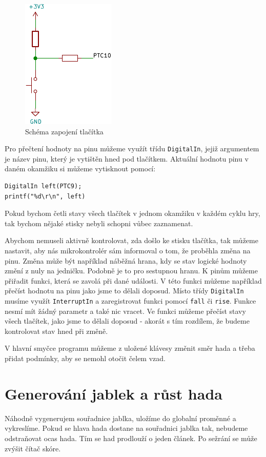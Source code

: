 \documentclass[12pt]{article}
\begin{document}
\begin{figure}[ht]
\centering
\includegraphics{figures/button}
\caption{Schéma zapojení tlačítka}
 \label{fig:button}
\end{figure}
\FloatBarrier

Pro přečtení hodnoty na pinu můžeme využít třídu \texttt{DigitalIn}, jejiž argumentem je název pinu, který je vytištěn hned pod tlačítkem.
Aktuální hodnotu pinu v daném okamžiku si můžeme vytisknout pomocí:
\begin{verbatim}
DigitalIn left(PTC9);
printf("%d\r\n", left)
\end{verbatim}

Pokud bychom četli stavy všech tlačítek v jednom okamžiku v každém cyklu hry, tak bychom nějaké stisky nebyli schopni vůbec zaznamenat. 

Abychom nemuseli aktivně kontrolovat, zda došlo ke stisku tlačítka, tak můžeme nastavit, aby nás mikrokontrolér sám informoval o tom, že proběhla změna na pinu.
Změna může být například náběžná hrana, kdy se stav logické hodnoty změní z nuly na jedničku.
Podobně je to pro sestupnou hranu.
K pinům můžeme přiřadit funkci, která se zavolá při dané události.
V této funkci můžeme například přečíst hodnotu na pinu jako jsme to dělali doposud.
Místo třídy \texttt{DigitalIn} musíme využít \texttt{InterruptIn} a zaregistrovat funkci pomocí \texttt{fall} či \texttt{rise}.
Funkce nesmí mít žádný parametr a také nic vracet.
Ve funkci můžeme přečíst stavy všech tlačítek, jako jsme to dělali doposud - akorát s tím rozdílem, že budeme kontrolovat stav hned při změně.

V hlavní smyčce programu můžeme z uložené klávesy změnit směr hada a třeba přidat podmínky, aby se nemohl otočit čelem vzad.

\section{Generování jablek a růst hada}
Náhodně vygenerujem souřadnice jablka, uložíme do globalní proměnné a vykreslíme.
Pokud se hlava hada dostane na souřadnici jablka tak, nebudeme odstraňovat ocas hada.
Tím se had prodlouží o jeden článek.
Po sežrání se může zvýšit čítač skóre.
\end{document}
